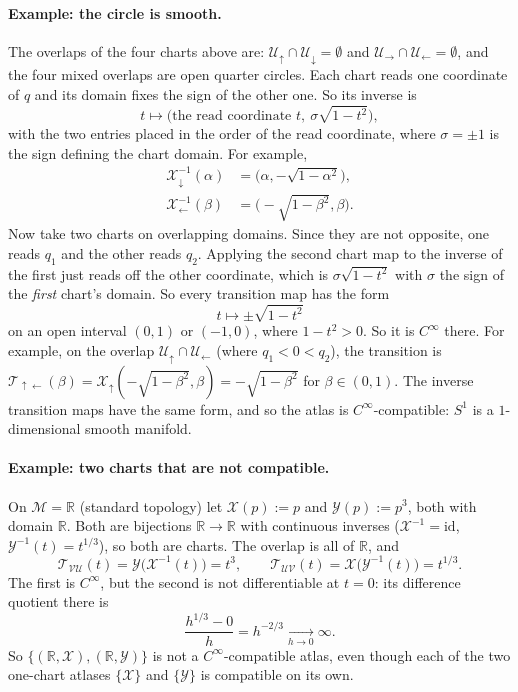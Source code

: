\documentclass[11pt]{article}
\begin{document}
\paragraph{Example: the circle is smooth.} The overlaps of the four charts above are: $\mathcal U_\uparrow\cap\mathcal U_\downarrow=\emptyset$ and $\mathcal U_\to\cap\mathcal U_\leftarrow=\emptyset$, and the four mixed overlaps are open quarter circles. Each chart reads one coordinate of $q$ and its domain fixes the sign of the other one. So its inverse is
\[
t\longmapsto\big(\text{the read coordinate }t,\ \sigma\sqrt{1-t^2}\big),
\]
with the two entries placed in the order of the read coordinate, where $\sigma=\pm1$ is the sign defining the chart domain. For example,
\begin{align*}
\mathcal X_\downarrow^{-1}(\alpha)&=\big(\alpha,-\sqrt{1-\alpha^2}\big),\\
\mathcal X_\leftarrow^{-1}(\beta)&=\big(-\sqrt{1-\beta^2},\beta\big).
\end{align*}
Now take two charts on overlapping domains. Since they are not opposite, one reads $q_1$ and the other reads $q_2$. Applying the second chart map to the inverse of the first just reads off the other coordinate, which is $\sigma\sqrt{1-t^2}$ with $\sigma$ the sign of the \emph{first} chart's domain. So every transition map has the form
\[
t\longmapsto\pm\sqrt{1-t^2}
\]
on an open interval $(0,1)$ or $(-1,0)$, where $1-t^2>0$. So it is $C^\infty$ there. For example, on the overlap $\mathcal U_\uparrow\cap\mathcal U_\leftarrow$ (where $q_1<0<q_2$), the transition is $\mathcal T_{\uparrow\leftarrow}(\beta)=\mathcal X_\uparrow(-\sqrt{1-\beta^2},\beta)=-\sqrt{1-\beta^2}$ for $\beta\in(0,1)$. The inverse transition maps have the same form, and so the atlas is $C^\infty$-compatible: $S^1$ is a $1$-dimensional smooth manifold.

\paragraph{Example: two charts that are not compatible.} On $\mathcal M=\mathbb R$ (standard topology) let $\mathcal X(p):=p$ and $\mathcal Y(p):=p^3$, both with domain $\mathbb R$. Both are bijections $\mathbb R\to\mathbb R$ with continuous inverses ($\mathcal X^{-1}=\mathrm{id}$, $\mathcal Y^{-1}(t)=t^{1/3}$), so both are charts. The overlap is all of $\mathbb R$, and
\[
\mathcal T_{\mathcal{VU}}(t)=\mathcal Y\big(\mathcal X^{-1}(t)\big)=t^3,\qquad
\mathcal T_{\mathcal{UV}}(t)=\mathcal X\big(\mathcal Y^{-1}(t)\big)=t^{1/3}.
\]
The first is $C^\infty$, but the second is not differentiable at $t=0$: its difference quotient there is
\[
\frac{h^{1/3}-0}{h}=h^{-2/3}\xrightarrow[h\to0]{}\infty.
\]
So $\{(\mathbb R,\mathcal X),(\mathbb R,\mathcal Y)\}$ is not a $C^\infty$-compatible atlas, even though each of the two one-chart atlases $\{\mathcal X\}$ and $\{\mathcal Y\}$ is compatible on its own.
\end{document}
